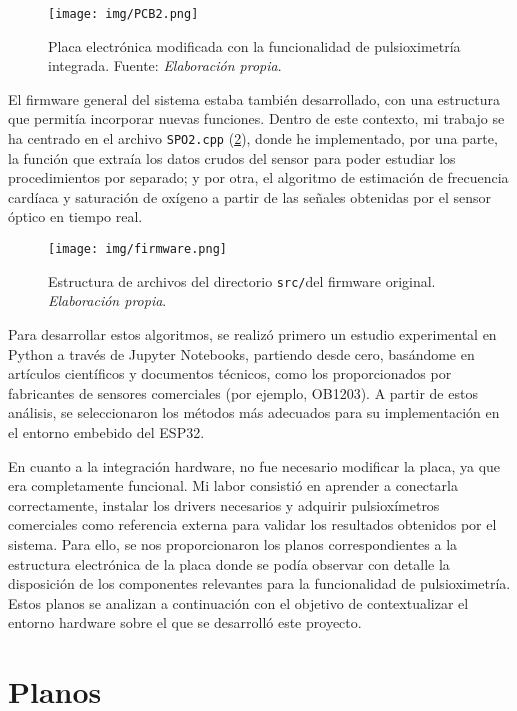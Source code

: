 \begin{figure}[H]
    \centering
    \texttt{[image: img/PCB2.png]}
    \caption{Placa electrónica modificada con la funcionalidad de pulsioximetría integrada. Fuente: \textit{Elaboración propia}.}
    \label{fig:PCB2}
\end{figure}

El firmware general del sistema estaba también desarrollado, con una estructura que permitía incorporar nuevas funciones. Dentro de este contexto, mi trabajo se ha centrado en el archivo \texttt{SPO2.cpp} (\ref{fig:firmware}), donde he implementado, por una parte, la función que extraía los datos crudos del sensor para poder estudiar los procedimientos por separado; y por otra, el algoritmo de estimación de frecuencia cardíaca y saturación de oxígeno a partir de las señales obtenidas por el sensor óptico en tiempo real.

\begin{figure}[H]
    \centering
    \texttt{[image: img/firmware.png]}
    \caption{Estructura de archivos del directorio \texttt{src/}del firmware original. \textit{Elaboración propia}.}
    \label{fig:firmware}
\end{figure}

Para desarrollar estos algoritmos, se realizó primero un estudio experimental en Python a través de Jupyter Notebooks, partiendo desde cero, basándome en artículos científicos y documentos técnicos, como los proporcionados por fabricantes de sensores comerciales (por ejemplo, OB1203). A partir de estos análisis, se seleccionaron los métodos más adecuados para su implementación en el entorno embebido del ESP32.

En cuanto a la integración hardware, no fue necesario modificar la placa, ya que era completamente funcional. Mi labor consistió en aprender a conectarla correctamente, instalar los drivers necesarios y adquirir pulsioxímetros comerciales como referencia externa para validar los resultados obtenidos por el sistema. Para ello, se nos proporcionaron los planos correspondientes a la estructura electrónica de la placa donde se podía observar con detalle la disposición de los componentes relevantes para la funcionalidad de pulsioximetría. Estos planos se analizan a continuación con el objetivo de contextualizar el entorno hardware sobre el que se desarrolló este proyecto.

\newpage

\section{Planos}

